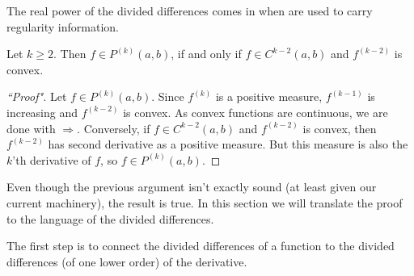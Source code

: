 The real power of the divided differences comes in when are used to carry regularity information.

\begin{lause}\label{k-tone_smooth}
	Let $k \geq 2$. Then $f \in P^{(k)}(a, b)$, if and only if $f \in C^{k - 2}(a, b)$ and $f^{(k - 2)}$ is convex.
\end{lause}
\begin{proof}[``Proof"]
	Let $f \in P^{(k)}(a, b)$. Since $f^{(k)}$ is a positive measure, $f^{(k - 1)}$ is increasing and $f^{(k - 2)}$ is convex. As convex functions are continuous, we are done with $\Rightarrow$. Conversely, if $f \in C^{k - 2}(a, b)$ and $f^{(k - 2)}$ is convex, then $f^{(k - 2)}$ has second derivative as a positive measure. But this measure is also the $k$'th derivative of $f$, so $f \in P^{(k)}(a, b)$.
\end{proof}

Even though the previous argument isn't exactly sound (at least given our current machinery), the result is true. In this section we will translate the proof to the language of the divided differences.

The first step is to connect the divided differences of a function to the divided differences (of one lower order) of the derivative.

